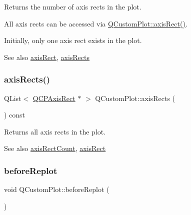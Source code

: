 Returns the number of axis rects in the plot.

All axis rects can be accessed via \mbox{\hyperlink{class_q_custom_plot_ae5eefcb5f6ca26689b1fd4f6e25b42f9}{Q\+Custom\+Plot\+::axis\+Rect()}}.

Initially, only one axis rect exists in the plot.

\begin{DoxySeeAlso}{See also}
\mbox{\hyperlink{class_q_custom_plot_ae5eefcb5f6ca26689b1fd4f6e25b42f9}{axis\+Rect}}, \mbox{\hyperlink{class_q_custom_plot_a12af771429e2d7e313c8c5d5fca068fe}{axis\+Rects}} 
\end{DoxySeeAlso}
\mbox{\label{class_q_custom_plot_a12af771429e2d7e313c8c5d5fca068fe}} 
\subsubsection{\texorpdfstring{axis\+Rects()}{axisRects()}}
{\footnotesize\ttfamily Q\+List$<$ \mbox{\hyperlink{class_q_c_p_axis_rect}{Q\+C\+P\+Axis\+Rect}} $\ast$ $>$ Q\+Custom\+Plot\+::axis\+Rects (\begin{DoxyParamCaption}{ }\end{DoxyParamCaption}) const}

Returns all axis rects in the plot.

\begin{DoxySeeAlso}{See also}
\mbox{\hyperlink{class_q_custom_plot_a8f85940aaac50efb466287d9d2d04ec6}{axis\+Rect\+Count}}, \mbox{\hyperlink{class_q_custom_plot_ae5eefcb5f6ca26689b1fd4f6e25b42f9}{axis\+Rect}} 
\end{DoxySeeAlso}
\mbox{\label{class_q_custom_plot_a0cd30e29b73efd6afe096e44bc5956f5}} 
\subsubsection{\texorpdfstring{before\+Replot}{beforeReplot}}
{\footnotesize\ttfamily void Q\+Custom\+Plot\+::before\+Replot (\begin{DoxyParamCaption}{ }\end{DoxyParamCaption})\hspace{0.3cm}{\ttfamily [signal]}}

